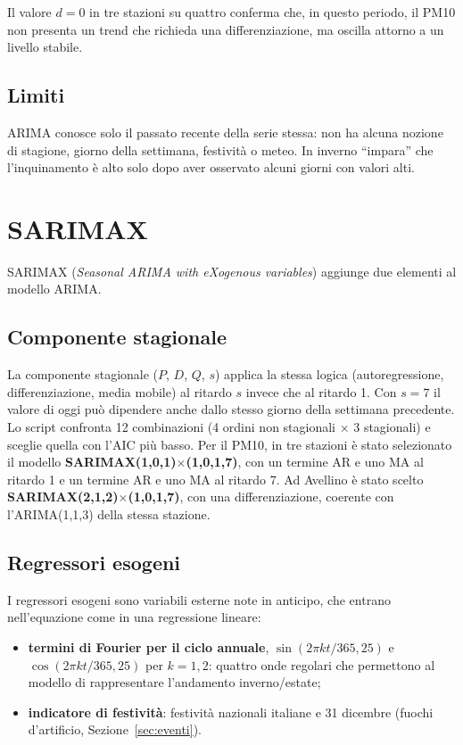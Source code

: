 \documentclass[11pt]{report}
\begin{document}
Il valore $d=0$ in tre stazioni su quattro conferma che, in questo periodo, il PM10
non presenta un trend che richieda una differenziazione, ma oscilla attorno a un
livello stabile.

\subsection{Limiti}
ARIMA conosce solo il passato recente della serie stessa: non ha alcuna nozione di
stagione, giorno della settimana, festività o meteo. In inverno ``impara'' che
l'inquinamento è alto solo dopo aver osservato alcuni giorni con valori alti.

\section{SARIMAX}
\label{sec:fc_sarimax}

SARIMAX (\emph{Seasonal ARIMA with eXogenous variables}) aggiunge due elementi al
modello ARIMA.

\subsection{Componente stagionale}
La componente stagionale ($P$, $D$, $Q$, $s$) applica la stessa logica
(autoregressione, differenziazione, media mobile) al ritardo $s$ invece che al
ritardo 1. Con $s=7$ il valore di oggi può dipendere anche dallo stesso giorno della
settimana precedente. Lo script confronta 12 combinazioni (4 ordini non stagionali
$\times$ 3 stagionali) e sceglie quella con l'AIC più basso. Per il PM10, in tre
stazioni è stato selezionato il modello
\textbf{SARIMAX(1,0,1)$\times$(1,0,1,7)}, con un termine AR e uno MA al ritardo 1
e un termine AR e uno MA al ritardo 7. Ad Avellino è stato scelto
\textbf{SARIMAX(2,1,2)$\times$(1,0,1,7)}, con una differenziazione, coerente con
l'ARIMA(1,1,3) della stessa stazione.

\subsection{Regressori esogeni}
I regressori esogeni sono variabili esterne note in anticipo, che entrano
nell'equazione come in una regressione lineare:
\begin{itemize}
  \item \textbf{termini di Fourier per il ciclo annuale},
        $\sin(2\pi k t / 365{,}25)$ e $\cos(2\pi k t / 365{,}25)$ per $k=1,2$:
        quattro onde regolari che permettono al modello di rappresentare
        l'andamento inverno/estate;
  \item \textbf{indicatore di festività}: festività nazionali italiane e 31
        dicembre (fuochi d'artificio, Sezione~\ref{sec:eventi}).
\end{itemize}
\end{document}

